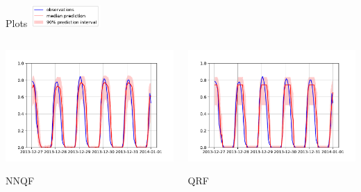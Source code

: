 \documentclass[10pt,aspectratio=169]{beamer}
\begin{document}
\begin{frame}{Plots}
    \includegraphics[width=0.2\textwidth]{plots/legend.pdf}
    \begin{columns}
        \begin{column}{0.33\textwidth}
            \includegraphics[width=\textwidth]{plots/nnqf_plot_9.pdf}
            \begin{center}
                NNQF
            \end{center}
        \end{column}
        \begin{column}{0.33\textwidth}
            \includegraphics[width=\textwidth]{plots/qrf_plot_9.pdf}
            \begin{center}
                QRF

\end{center}
\end{column}
\end{columns}
\end{frame}
\end{document}
